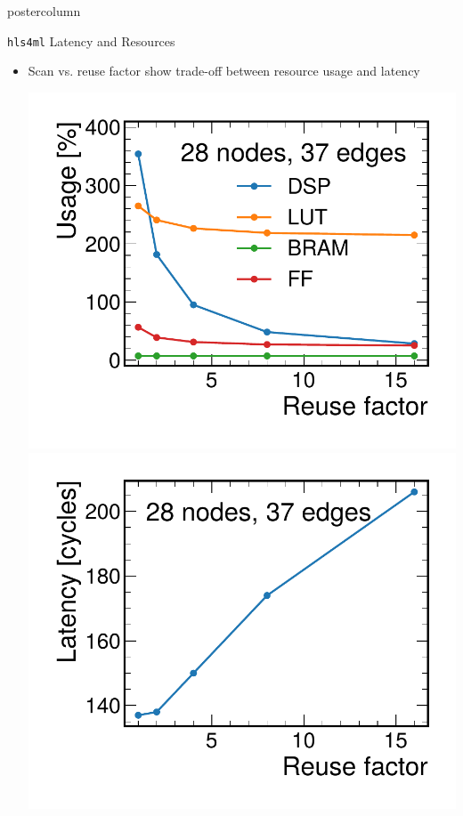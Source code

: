 \documentclass[final,hyperref={pdfpagelabels=false}]{beamer}
\newcommand{\hlsfml}{{\texttt{hls4ml}}\xspace}
\begin{document}
\begin{frame}
\begin{columns}
\begin{column}{.33\textwidth}
\begin{beamercolorbox}[center,wd=\textwidth]{postercolumn}
\begin{minipage}[T]{.95\textwidth}
{\begin{block}{\hlsfml Latency and Resources}
\begin{itemize}
\begin{center}
                \end{center}
                \item Scan vs. reuse factor show trade-off between resource usage and latency
                \begin{center}
                    \includegraphics[width=0.49\linewidth]{figures/Resources_vs_RF.pdf}
                    \includegraphics[width=0.49\linewidth]{figures/Latency_vs_RF.pdf}
                \end{center}
              \end{itemize}
            \end{block}\vspace{-2cm}
            
}
\end{minipage}
\end{beamercolorbox}
\end{column}
\end{columns}
\end{frame}
\end{document}
